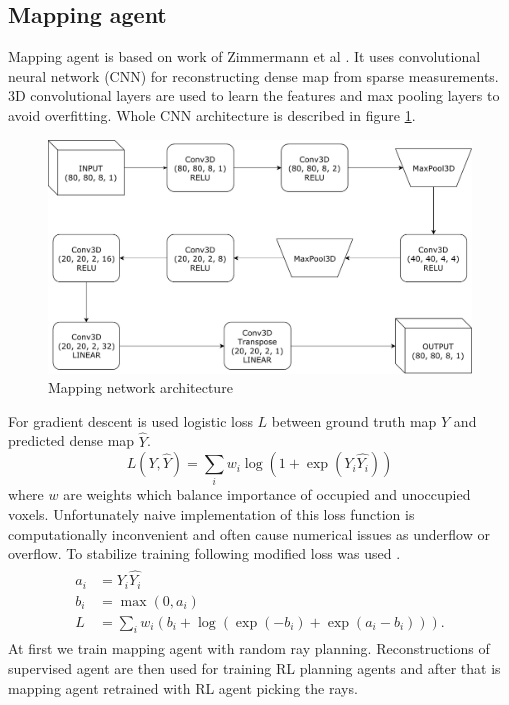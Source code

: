 \subsection{Mapping agent}
Mapping agent is based on work of Zimmermann et al \cite{zimmermann2017}. It uses convolutional neural network (CNN) for reconstructing dense map from sparse measurements. 3D convolutional layers are used to learn the features and max pooling layers to avoid overfitting. Whole CNN architecture is described in figure \ref{fig:supervised}.
\vspace{3mm}
\begin{figure}[!h]
\centering
\includegraphics[scale=0.6]{fig/supervised.pdf}
\caption{Mapping network architecture}
\label{fig:supervised}
\end{figure}

For gradient descent is used logistic loss $L$ between ground truth map $Y$ and predicted dense map $\hat{Y}$.
\begin{equation} \label{eq:loglos}
L(Y, \hat{Y}) = \sum\limits_i w_i \log(1 + \exp(Y_i \hat{Y_i}))
\end{equation}
where $w$ are weights which balance importance of occupied and unoccupied voxels.
\pagebreak
Unfortunately naive implementation of this loss function is computationally inconvenient and often cause numerical issues as underflow or overflow. To stabilize training following modified loss was used \cite{matconvnet2015}.
\begin{align} 
\begin{split}
a_i &= Y_i \hat{Y_i} \\
b_i &= \max(0, a_i) \\
L &= \sum\limits_i w_i (b_i + \log(\exp(-b_i) + \exp(a_i-b_i))).
\end{split}
\end{align}
At first we train mapping agent with random ray planning. Reconstructions of supervised agent are then used for training RL planning agents and after that is mapping agent retrained with RL agent picking the rays.
